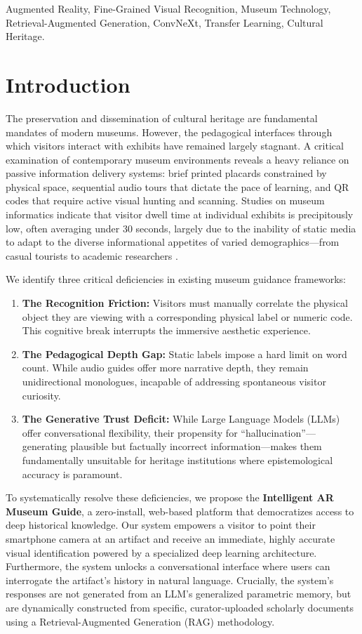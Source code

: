 \documentclass[conference]{IEEEtran}
\begin{document}
\begin{IEEEkeywords}
Augmented Reality, Fine-Grained Visual Recognition, Museum Technology, Retrieval-Augmented Generation, ConvNeXt, Transfer Learning, Cultural Heritage.
\end{IEEEkeywords}

\section{Introduction}
The preservation and dissemination of cultural heritage are fundamental mandates of modern museums. However, the pedagogical interfaces through which visitors interact with exhibits have remained largely stagnant. A critical examination of contemporary museum environments reveals a heavy reliance on passive information delivery systems: brief printed placards constrained by physical space, sequential audio tours that dictate the pace of learning, and QR codes that require active visual hunting and scanning. Studies on museum informatics indicate that visitor dwell time at individual exhibits is precipitously low, often averaging under 30 seconds, largely due to the inability of static media to adapt to the diverse informational appetites of varied demographics—from casual tourists to academic researchers \cite{aam_trends}.

We identify three critical deficiencies in existing museum guidance frameworks:
\begin{enumerate}
    \item \textbf{The Recognition Friction:} Visitors must manually correlate the physical object they are viewing with a corresponding physical label or numeric code. This cognitive break interrupts the immersive aesthetic experience.
    \item \textbf{The Pedagogical Depth Gap:} Static labels impose a hard limit on word count. While audio guides offer more narrative depth, they remain unidirectional monologues, incapable of addressing spontaneous visitor curiosity.
    \item \textbf{The Generative Trust Deficit:} While Large Language Models (LLMs) offer conversational flexibility, their propensity for ``hallucination''—generating plausible but factually incorrect information—makes them fundamentally unsuitable for heritage institutions where epistemological accuracy is paramount.
\end{enumerate}

To systematically resolve these deficiencies, we propose the \textbf{Intelligent AR Museum Guide}, a zero-install, web-based platform that democratizes access to deep historical knowledge. Our system empowers a visitor to point their smartphone camera at an artifact and receive an immediate, highly accurate visual identification powered by a specialized deep learning architecture. Furthermore, the system unlocks a conversational interface where users can interrogate the artifact's history in natural language. Crucially, the system's responses are not generated from an LLM's generalized parametric memory, but are dynamically constructed from specific, curator-uploaded scholarly documents using a Retrieval-Augmented Generation (RAG) methodology.
\end{document}
